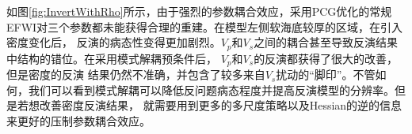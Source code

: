 如图\ref{fig:InvertWithRho}所示，由于强烈的参数耦合效应，采用PCG优化的常规EFWI对三个参数都未能获得合理的重建。在模型左侧软海底较厚的区域，在引入密度变化后，
反演的病态性变得更加剧烈。$V_p$和$V_s$之间的耦合甚至导致反演结果中结构的错位。在采用模式解耦预条件后， $V_p$和$V_s$的反演都获得了很大的改善，但是密度的反演
结果仍然不准确，并包含了较多来自$V_s$扰动的“脚印”。不管如何，我们可以看到模式解耦可以降低反问题病态程度并提高反演模型的分辨率。但是若想改善密度反演结果，
就需要用到更多的多尺度策略以及Hessian的逆的信息来更好的压制参数耦合效应。
\begin{figure}
    \begin{center}
        \\
        \\

\end{center}
\end{figure}

